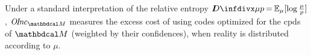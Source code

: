 \documentclass{article}
\begin{document}
Under a standard interpretation of the relative entropy $\kldiv{\mu}{p} \mskip-1.5mu=\mskip-1.5mu \Ex_{\mu}[\log \frac\mu p]$,
$\OInc_{\dg M}$ measures the excess cost of using codes optimized for the cpds of $\dg M$ 
(weighted by their confidences),
when reality is
distributed according to $\mu$.
\end{document}
